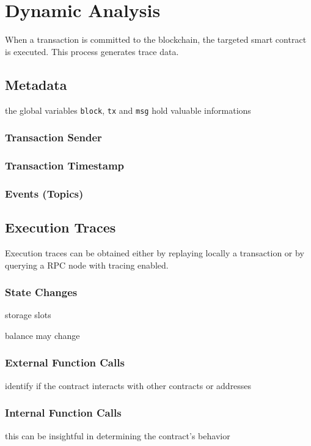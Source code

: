 \section{Dynamic Analysis} \label{sec:data-dynamic}

When a transaction is committed to the blockchain, the targeted smart contract is executed.
This process generates trace data.

\subsection{Metadata}

the global variables \lstinline[language=Solidity]{block}, \lstinline[language=Solidity]{tx} and \lstinline[language=Solidity]{msg} hold valuable informations

\subsubsection{Transaction Sender}

\subsubsection{Transaction Timestamp}

\subsubsection{Events (Topics)}

\subsection{Execution Traces}

Execution traces can be obtained either by replaying locally a transaction or by querying a RPC node with tracing enabled.

\subsubsection{State Changes}

storage slots

balance may change

\subsubsection{External Function Calls}

identify if the contract interacts with other contracts or addresses

\subsubsection{Internal Function Calls}

this can be insightful in determining the contract's behavior
